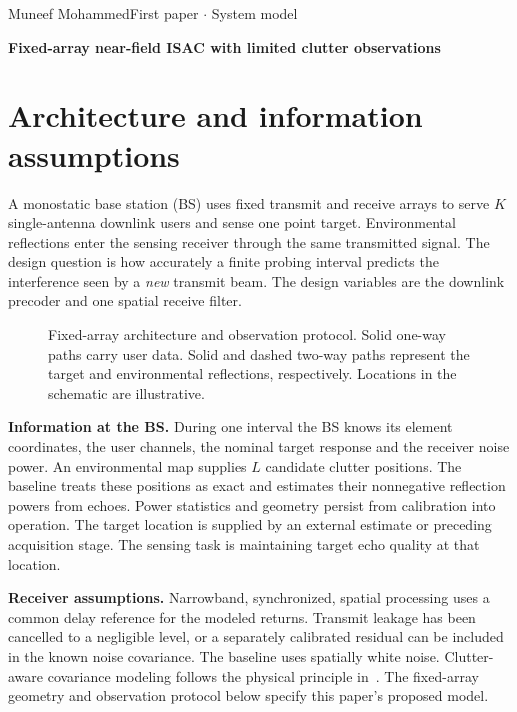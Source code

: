 {\large Muneef Mohammed}\hfill{\small First paper $\cdot$ System model}\par
\vspace{3mm}
{\LARGE\bfseries Fixed-array near-field ISAC with limited clutter observations\par}
\vspace{2mm}
\section{Architecture and information assumptions}
A monostatic base station (BS) uses fixed transmit and receive arrays to serve $K$ single-antenna downlink users and sense one point target. Environmental reflections enter the sensing receiver through the same transmitted signal. The design question is how accurately a finite probing interval predicts the interference seen by a \emph{new} transmit beam. The design variables are the downlink precoder and one spatial receive filter.
\begin{figure}[h!]\centering\resizebox{\linewidth}{!}{\systemdrawing}
\caption{Fixed-array architecture and observation protocol. Solid one-way paths carry user data. Solid and dashed two-way paths represent the target and environmental reflections, respectively. Locations in the schematic are illustrative.}\label{fig:system}\end{figure}

\textbf{Information at the BS.} During one interval the BS knows its element coordinates, the user channels, the nominal target response and the receiver noise power. An environmental map supplies $L$ candidate clutter positions. The baseline treats these positions as exact and estimates their nonnegative reflection powers from echoes. Power statistics and geometry persist from calibration into operation. The target location is supplied by an external estimate or preceding acquisition stage. The sensing task is maintaining target echo quality at that location.

\textbf{Receiver assumptions.} Narrowband, synchronized, spatial processing uses a common delay reference for the modeled returns. Transmit leakage has been cancelled to a negligible level, or a separately calibrated residual can be included in the known noise covariance. The baseline uses spatially white noise. Clutter-aware covariance modeling follows the physical principle in~\cite{liu2026clutter}. The fixed-array geometry and observation protocol below specify this paper's proposed model.
\newpage
